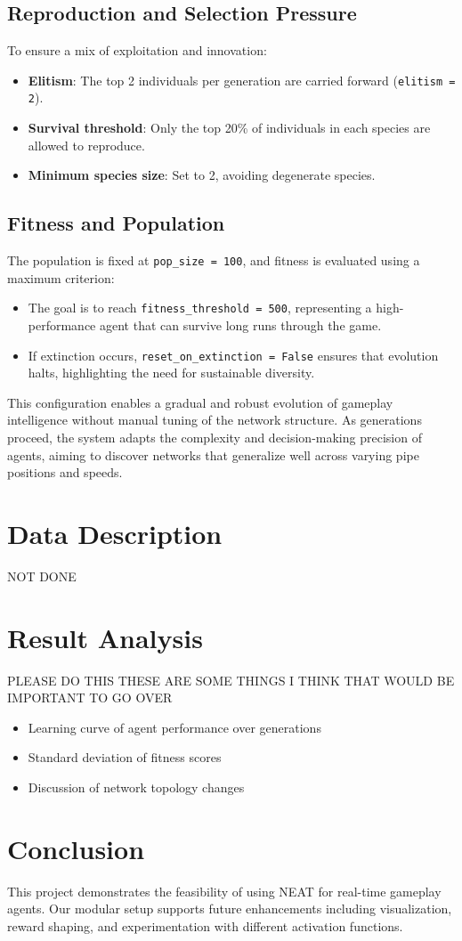 \documentclass[sigconf]{acmart}
\begin{document}
\subsection{Reproduction and Selection Pressure}
To ensure a mix of exploitation and innovation:
\begin{itemize}
  \item \textbf{Elitism}: The top 2 individuals per generation are carried forward (\texttt{elitism = 2}).
  \item \textbf{Survival threshold}: Only the top 20\% of individuals in each species are allowed to reproduce.
  \item \textbf{Minimum species size}: Set to 2, avoiding degenerate species.
\end{itemize}

\subsection{Fitness and Population}
The population is fixed at \texttt{pop\_size = 100}, and fitness is evaluated using a maximum criterion:
\begin{itemize}
  \item The goal is to reach \texttt{fitness\_threshold = 500}, representing a high-performance agent that can survive long runs through the game.
  \item If extinction occurs, \texttt{reset\_on\_extinction = False} ensures that evolution halts, highlighting the need for sustainable diversity.
\end{itemize}

This configuration enables a gradual and robust evolution of gameplay intelligence without manual tuning of the network structure. As generations proceed, the system adapts the complexity and decision-making precision of agents, aiming to discover networks that generalize well across varying pipe positions and speeds.


\section{Data Description}
NOT DONE

\section{Result Analysis}
PLEASE DO THIS THESE ARE SOME THINGS I THINK THAT WOULD BE IMPORTANT TO GO OVER
\begin{itemize}
  \item Learning curve of agent performance over generations
  \item Standard deviation of fitness scores
  \item Discussion of network topology changes
\end{itemize}

\section{Conclusion}
This project demonstrates the feasibility of using NEAT for real-time gameplay agents. Our modular setup supports future enhancements including visualization, reward shaping, and experimentation with different activation functions.
\end{document}
